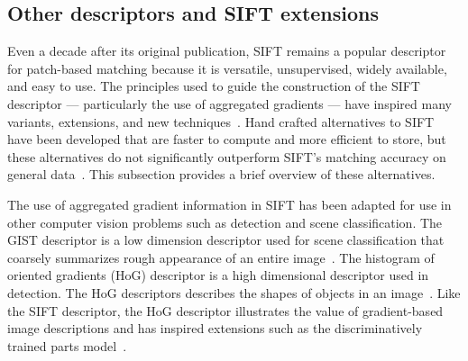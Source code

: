     \subsection{Other descriptors and SIFT extensions}
        Even a decade after its original publication, SIFT remains a popular descriptor for patch-based matching
        because it is versatile, unsupervised, widely available, and easy to use.
        The principles used to guide the construction of the SIFT descriptor --- particularly the use of aggregated
        gradients --- have inspired many variants, extensions, and new
        techniques~\cite{mikolajczyk_performance_2005, dalal_histograms_2005, bay_surf_2006}. Hand crafted
        alternatives to SIFT have been developed that are faster to compute and more efficient to store, but these
        alternatives do not significantly outperform SIFT's matching accuracy on general
        data~\cite{lowe_distinctive_2004, mikolajczyk_performance_2005, alahi_freak_2012}.
        This subsection provides a brief overview of these alternatives.

        The use of aggregated gradient information in SIFT has been adapted for use in other computer vision
        problems such as detection and scene classification.
        The GIST descriptor is a low dimension descriptor used for scene classification that coarsely summarizes
        rough appearance of an entire image~\cite{oliva_modeling_2001, douze_evaluation_2009}.
        The histogram of oriented gradients (HoG) descriptor is a high dimensional descriptor used in detection.
        The HoG descriptors describes the shapes of objects in an image~\cite{dalal_histograms_2005}. Like the SIFT
        descriptor, the HoG descriptor illustrates the value of gradient-based image descriptions and has inspired
        extensions such as the discriminatively trained parts model~\cite{felzenszwalb_object_2010}.

